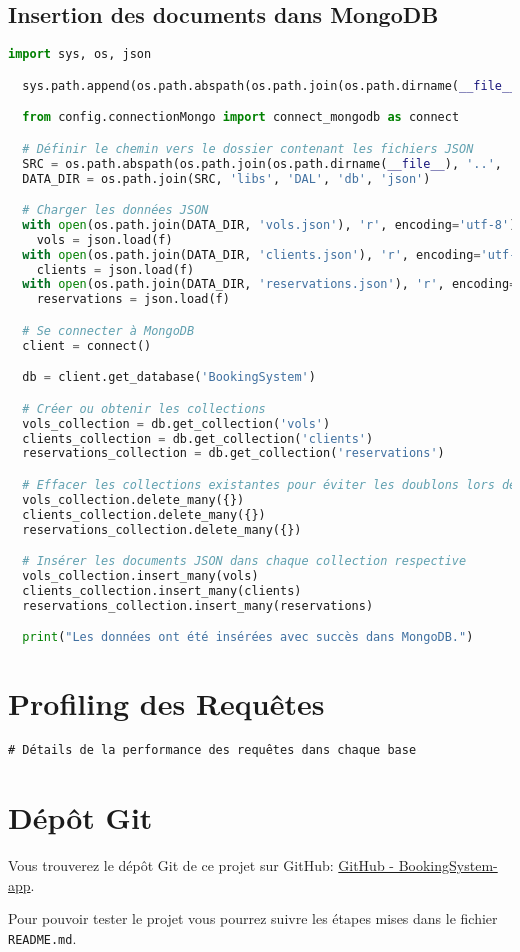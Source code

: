 \subsection{Insertion des documents dans MongoDB}
\label{ann:mongo_insert}
\begin{lstlisting}[language=Python, caption=Script d'insertion des documents dans MongoDB, label=lst:mongo_insert]
  import sys, os, json

  sys.path.append(os.path.abspath(os.path.join(os.path.dirname(__file__), '..', '..')))

  from config.connectionMongo import connect_mongodb as connect

  # Définir le chemin vers le dossier contenant les fichiers JSON
  SRC = os.path.abspath(os.path.join(os.path.dirname(__file__), '..', '..'))
  DATA_DIR = os.path.join(SRC, 'libs', 'DAL', 'db', 'json')

  # Charger les données JSON
  with open(os.path.join(DATA_DIR, 'vols.json'), 'r', encoding='utf-8') as f: 
    vols = json.load(f)
  with open(os.path.join(DATA_DIR, 'clients.json'), 'r', encoding='utf-8') as f: 
    clients = json.load(f)
  with open(os.path.join(DATA_DIR, 'reservations.json'), 'r', encoding='utf-8') as f: 
    reservations = json.load(f)

  # Se connecter à MongoDB
  client = connect()

  db = client.get_database('BookingSystem')

  # Créer ou obtenir les collections
  vols_collection = db.get_collection('vols')
  clients_collection = db.get_collection('clients')
  reservations_collection = db.get_collection('reservations')

  # Effacer les collections existantes pour éviter les doublons lors de ré-exécutions
  vols_collection.delete_many({})
  clients_collection.delete_many({})
  reservations_collection.delete_many({})

  # Insérer les documents JSON dans chaque collection respective
  vols_collection.insert_many(vols)
  clients_collection.insert_many(clients)
  reservations_collection.insert_many(reservations)

  print("Les données ont été insérées avec succès dans MongoDB.")
\end{lstlisting}

\section{Profiling des Requêtes}
\label{ann:profiling}
\begin{verbatim}
# Détails de la performance des requêtes dans chaque base
\end{verbatim}

\section{Dépôt Git}
\label{ann:git_repo}
Vous trouverez le dépôt Git de ce projet sur GitHub: \href{https://github.com/sessaadouni/BookingSystem-app}{GitHub - BookingSystem-app}.

Pour pouvoir tester le projet vous pourrez suivre les étapes mises dans le fichier \texttt{README.md}.